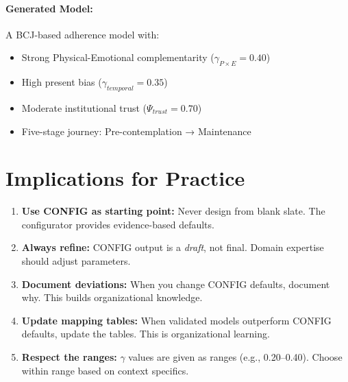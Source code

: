 \paragraph{Generated Model:}
A BCJ-based adherence model with:
\begin{itemize}
\item Strong Physical-Emotional complementarity ($\gamma_{P \times E} = 0.40$)
\item High present bias ($\gamma_{temporal} = 0.35$)
\item Moderate institutional trust ($\Psi_{trust} = 0.70$)
\item Five-stage journey: Pre-contemplation → Maintenance
\end{itemize}


\section{Implications for Practice}
\label{sec:ggg-practice}

\begin{tcolorbox}[colback=green!5!white, colframe=green!75!black,
    title=Practical Implications]
\begin{enumerate}
\item \textbf{Use CONFIG as starting point:} Never design from blank slate.
    The configurator provides evidence-based defaults.
\item \textbf{Always refine:} CONFIG output is a \textit{draft}, not final.
    Domain expertise should adjust parameters.
\item \textbf{Document deviations:} When you change CONFIG defaults, document
    why. This builds organizational knowledge.
\item \textbf{Update mapping tables:} When validated models outperform CONFIG
    defaults, update the tables. This is organizational learning.
\item \textbf{Respect the ranges:} $\gamma$ values are given as ranges (e.g., 0.20--0.40).
    Choose within range based on context specifics.
\end{enumerate}
\end{tcolorbox}



